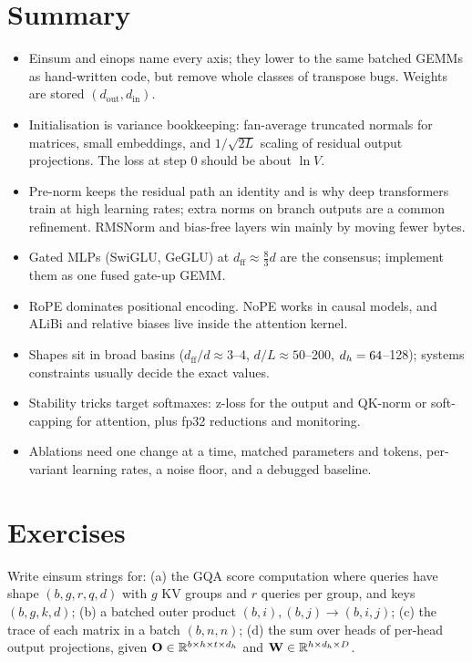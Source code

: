 \section{Summary}\label{sec:archdesign:summary}
\begin{itemize}
\item Einsum and einops name every axis; they lower to the same batched GEMMs as hand-written code, but
  remove whole classes of transpose bugs. Weights are stored $(d_\text{out},d_\text{in})$.
\item Initialisation is variance bookkeeping: fan-average truncated normals for matrices, small embeddings,
  and $1/\sqrt{2L}$ scaling of residual output projections. The loss at step 0 should be about $\ln V$.
\item Pre-norm keeps the residual path an identity and is why deep transformers train at high learning
  rates; extra norms on branch outputs are a common refinement. RMSNorm and bias-free layers win mainly
  by moving fewer bytes.
\item Gated MLPs (SwiGLU, GeGLU) at $d_\text{ff}\approx\frac83 d$ are the consensus; implement them as one
  fused gate-up GEMM.
\item RoPE dominates positional encoding. NoPE works in causal models, and ALiBi and relative biases live
  inside the attention kernel.
\item Shapes sit in broad basins ($d_\text{ff}/d\approx 3$--4, $d/L\approx 50$--200, $d_{h}=64$--128);
  systems constraints usually decide the exact values.
\item Stability tricks target softmaxes: z-loss for the output and QK-norm or soft-capping for
  attention, plus fp32 reductions and monitoring.
\item Ablations need one change at a time, matched parameters and tokens, per-variant learning rates, a
  noise floor, and a debugged baseline.
\end{itemize}

\section{Exercises}\label{sec:archdesign:exercises}

\begin{exercise}
Write einsum strings for: (a) the GQA score computation where queries have shape $(b,g,r,q,d)$ with
$g$ KV groups and $r$ queries per group, and keys $(b,g,k,d)$; (b) a batched outer product
$(b,i),(b,j)\to(b,i,j)$; (c) the trace of each matrix in a batch $(b,n,n)$; (d) the sum over heads of
per-head output projections, given $\mathbf{O}\in\mathbb{R}^{b\times h\times t\times d_h}$ and
$\mathbf{W}\in\mathbb{R}^{h\times d_h\times D}$.
\end{exercise}

